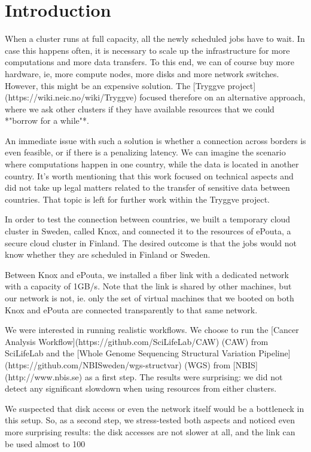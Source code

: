 \section{Introduction}
\label{section:intro}


When a cluster runs at full capacity, all the newly scheduled jobs
have to wait. In case this happens often, it is necessary to scale up
the infrastructure for more computations and more data transfers. To
this end, we can of course buy more hardware, ie, more compute nodes,
more disks and more network switches. However, this might be an
expensive
solution. The [Tryggve project](https://wiki.neic.no/wiki/Tryggve)
focused therefore on an alternative approach, where we ask other
clusters if they have available resources that we could *"borrow for a
while"*.

An immediate issue with such a solution is whether a connection across
borders is even feasible, or if there is a penalizing latency. We can
imagine the scenario where computations happen in one country, while
the data is located in another country. It’s worth mentioning that
this work focused on technical aspects and did not take up legal
matters related to the transfer of sensitive data between
countries. That topic is left for further work within
the Tryggve project.

In order to test the connection between countries, we built a
temporary cloud cluster in Sweden, called Knox, and connected it to
the resources of ePouta, a secure cloud cluster in Finland. The
desired outcome is that the jobs would not know whether they are
scheduled in Finland or Sweden.

Between Knox and ePouta, we installed a fiber link with a dedicated
network with a capacity of 1GB/s. Note that the link is shared by
other machines, but our network is not, ie. only the set of virtual
machines that we booted on both Knox and ePouta are connected
transparently to that same network.

We were interested in running realistic workflows. We choose to run
the [Cancer Analysis Workflow](https://github.com/SciLifeLab/CAW)
(CAW) from SciLifeLab and the [Whole Genome Sequencing Structural
Variation Pipeline](https://github.com/NBISweden/wgs-structvar) (WGS)
from [NBIS](http://www.nbis.se) as a first step. The results were
surprising: we did not detect any significant slowdown when using
resources from either clusters.

We suspected that disk access or even the network itself would be a
bottleneck in this setup. So, as a second step, we stress-tested both
aspects and noticed even more surprising results: the disk accesses
are not slower at all, and the link can be used almost to 100%

